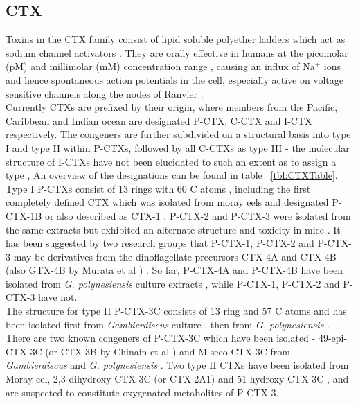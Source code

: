 \documentclass[12pt]{article}
\begin{document}
\subsection{CTX}
Toxins in the CTX family consist of lipid soluble polyether ladders which act as sodium channel activators \cite{dechraoui1999ciguatoxins}. They are orally effective in humans at the picomolar (pM) and millimolar (mM) concentration range \cite{molgo2000ciguatera}, causing an influx of Na$^{+}$ ions and hence spontaneous action potentials in the cell, especially active on voltage sensitive channels along the nodes of Ranvier \cite{sims1987theoretical,mattei1999neurotoxins,lewis1992action,molgo2000ciguatera}. \\
Currently CTXs are prefixed by their origin, where members from the Pacific, Caribbean and Indian ocean are designated P-CTX, C-CTX and I-CTX respectively. %
The congeners are further subdivided on a structural basis into type I and type II within P-CTXs, followed by all C-CTXs as type III - the molecular structure of I-CTXs have not been elucidated to such an extent as to assign a type \cite{legrand1997two,hamilton2002multiple,hamilton2002isolation}, An overview of the designations can be found in table ~\ref{tbl:CTXTable}.  \\
Type I P-CTXs consist of 13 rings with 60 C atoms \cite{murata1990structures,lewis1991purification,lewis1993origin}, including the first completely defined CTX which was isolated from moray eels and designated P-CTX-1B \cite{murata1990structures} or also described as CTX-1 \cite{lewis1991purification}. P-CTX-2 and P-CTX-3 were isolated from the same extracts but exhibited an alternate structure and toxicity in mice \cite{lewis1991purification}. It has been suggested by two research groups that P-CTX-1, P-CTX-2 and P-CTX-3 may be derivatives from the dinoflagellate precursors CTX-4A and CTX-4B (also GTX-4B by Murata et al \cite{murata1990structures}) \cite{lewis1993origin,yasumoto2000structural}. So far, P-CTX-4A and P-CTX-4B have been isolated from \emph{G. polynesiensis} culture extracts \cite{chinain2010growth}, while P-CTX-1, P-CTX-2 and P-CTX-3 have not. \\
The structure for type II P-CTX-3C consists of 13 ring and 57 C atoms and has been isolated first from \emph{Gambierdiscus} culture \cite{satake1993structure}, then from \emph{G. polynesiensis} \cite{chinain2010growth}. There are two known congeners of P-CTX-3C which have been isolated - 49-epi-CTX-3C (or CTX-3B by Chinain et al \cite{chinain2010growth}) and M-seco-CTX-3C from \emph{Gambierdiscus} \cite{satake1993structure} and \emph{G. polynesiensis} \cite{chinain2010growth}. Two type II CTXs have been isolated from Moray eel, 2,3-dihydroxy-CTX-3C (or CTX-2A1) and 51-hydroxy-CTX-3C \cite{satake1998isolation}, and are suspected to constitute oxygenated metabolites of P-CTX-3. \\ %
\end{document}
